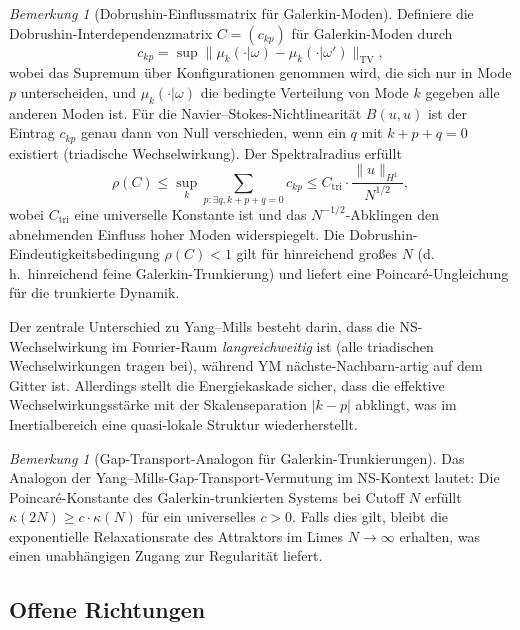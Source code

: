 \documentclass[12pt,a4paper]{article}
\theoremstyle{definition}
\theoremstyle{plain}
\theoremstyle{remark}
\newtheorem{remark}[definition]{Bemerkung}
\begin{document}
\begin{remark}[Dobrushin-Einflussmatrix für Galerkin-Moden]
\label{rem:dobrushin-galerkin}
Definiere die Dobrushin-Interdependenzmatrix $C = (c_{kp})$ für Galerkin-Moden durch
\[
c_{kp} = \sup \| \mu_k(\cdot | \omega) - \mu_k(\cdot | \omega') \|_{\mathrm{TV}},
\]
wobei das Supremum über Konfigurationen genommen wird, die sich nur in Mode $p$ unterscheiden, und $\mu_k(\cdot | \omega)$ die bedingte Verteilung von Mode $k$ gegeben alle anderen Moden ist. Für die Navier--Stokes-Nichtlinearität $B(u, u)$ ist der Eintrag $c_{kp}$ genau dann von Null verschieden, wenn ein $q$ mit $k + p + q = 0$ existiert (triadische Wechselwirkung). Der Spektralradius erfüllt
\[
\rho(C) \leq \sup_k \sum_{p: \exists q, k+p+q=0} c_{kp} \leq C_{\mathrm{tri}} \cdot \frac{\|u\|_{H^1}}{N^{1/2}},
\]
wobei $C_{\mathrm{tri}}$ eine universelle Konstante ist und das $N^{-1/2}$-Abklingen den abnehmenden Einfluss hoher Moden widerspiegelt. Die Dobrushin-Eindeutigkeitsbedingung $\rho(C) < 1$ gilt für hinreichend großes $N$ (d.\,h.\ hinreichend feine Galerkin-Trunkierung) und liefert eine Poincar\'e-Ungleichung für die trunkierte Dynamik.

Der zentrale Unterschied zu Yang--Mills besteht darin, dass die NS-Wechselwirkung im Fourier-Raum \emph{langreichweitig} ist (alle triadischen Wechselwirkungen tragen bei), während YM nächste-Nachbarn-artig auf dem Gitter ist. Allerdings stellt die Energiekaskade sicher, dass die effektive Wechselwirkungsstärke mit der Skalenseparation $|k - p|$ abklingt, was im Inertialbereich eine quasi-lokale Struktur wiederherstellt.
\end{remark}

\begin{remark}[Gap-Transport-Analogon für Galerkin-Trunkierungen]
\label{rem:gap-transport-galerkin}
Das Analogon der Yang--Mills-Gap-Transport-Vermutung im NS-Kontext lautet: Die Poincar\'e-Konstante des Galerkin-trunkierten Systems bei Cutoff $N$ erfüllt $\kappa(2N) \geq c \cdot \kappa(N)$ für ein universelles $c > 0$. Falls dies gilt, bleibt die exponentielle Relaxationsrate des Attraktors im Limes $N \to \infty$ erhalten, was einen unabhängigen Zugang zur Regularität liefert.
\end{remark}

\subsection{Offene Richtungen}
\end{document}
